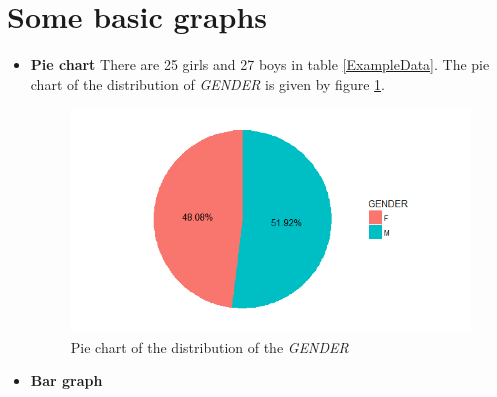 \documentclass[a4paper, 12pt,twoside]{book}
\begin{document}
\section{Some basic graphs}
\begin{itemize}
\item \textbf{Pie chart}
There are 25 girls and 27 boys in table \ref{ExampleData}. The pie chart of the  distribution of \textit{GENDER} is given by figure \ref{piechart}.
  \begin{center}
    \begin{figure}[!htb]
     \centering
    \includegraphics[scale=0.35]{PieChart.png}
    \caption{Pie chart of the distribution of the \textit{GENDER} }
    \label{piechart}
    \end{figure}  
\end{center} 

\item \textbf{Bar graph}


\end{itemize}
\end{document}
